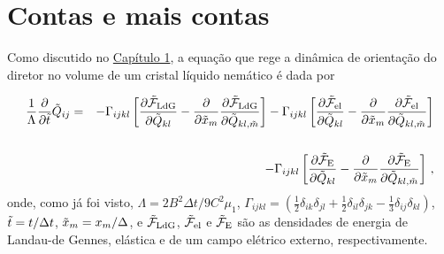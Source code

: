 \hypertarget{apen}{}
\chapter{Contas e mais contas}

Como discutido no \hyperlink{cap1}{Capítulo 1}, a equação que rege a
dinâmica de orientação do diretor no volume de um cristal líquido
nemático é dada por

\begin{eqnarray}
\frac{1}{\Lambda} \frac{\partial}{\partial \Tilde{t}} \Tilde{Q}_{ij} & =
& - \Gamma_{ijkl} \left[ \frac{\partial \Tilde{\mathcal{F}}_{\rm
LdG}}{\partial \Tilde{Q}_{kl}}- \frac{\partial }{\partial
\Tilde{x}_m}\frac{\partial \Tilde{\mathcal{F}}_{\rm LdG}}{\partial
\Tilde{Q}_{kl,\Tilde{m}}}\right] -\Gamma_{ijkl} \left[ \frac{\partial
\Tilde{\mathcal{F}}_{\rm el}}{\partial \Tilde{Q}_{kl}}- \frac{\partial
}{\partial \Tilde{x}_m}\frac{\partial \Tilde{\mathcal{F}}_{\rm
el}}{\partial \Tilde{Q}_{kl,\Tilde{m}}}\right] \nonumber \\ & &
\nonumber \\ & & -\Gamma_{ijkl}\left[ \frac{\partial
\Tilde{\mathcal{F}}_{\rm E}}{\partial \Tilde{Q}_{kl}}- \frac{\partial
}{\partial \Tilde{x}_m}\frac{\partial \Tilde{\mathcal{F}}_{\rm
E}}{\partial \Tilde{Q}_{kl,\Tilde{m}}}\right]\,,
	\label{dinamica_volume} 
\end{eqnarray}
onde, como já foi visto, $\Lambda= 2B^2 \Delta t / 9C^2\mu_1$,
$\Gamma_{ijkl}= ( \frac{1}{2} \delta_{ik} \delta_{jl}+ \frac{1}{2}
\delta_{il} \delta_{jk}- \frac{1}{3} \delta_{ij} \delta_{kl})$,
$\Tilde{t}= t/\Delta t$, $\Tilde{x}_m = x_m/\Delta$, e
$\Tilde{\mathcal{F}}_{\rm LdG}$, $\Tilde{\mathcal{F}}_{\rm el}$ e
$\Tilde{\mathcal{F}}_{\rm E}$ são as densidades de energia de Landau-de
Gennes, elástica e de um campo elétrico externo, respectivamente.
